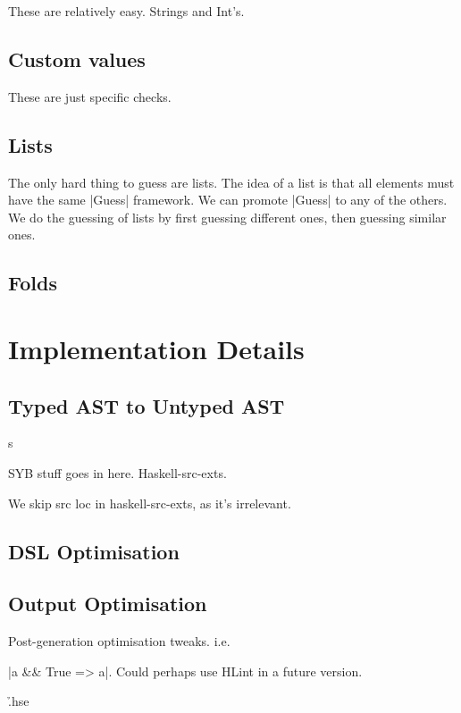 \documentclass[preprint]{sigplanconf}
\begin{document}
These are relatively easy. Strings and Int's.

\subsection{Custom values}

These are just specific checks.

\subsection{Lists}

The only hard thing to guess are lists. The idea of a list is that all elements must have the same |Guess| framework. We can promote |Guess| to any of the others. We do the guessing of lists by first guessing different ones, then guessing similar ones.

\subsection{Folds}


\section{Implementation Details}
\label{sec:implementation}

\subsection{Typed AST to Untyped AST}s
\label{sec:universe}

SYB stuff goes in here. Haskell-src-exts.

We skip src loc in haskell-src-exts, as it's irrelevant.

\subsection{DSL Optimisation}

\subsection{Output Optimisation}
\label{sec:simplify}

Post-generation optimisation tweaks. i.e. \ignore|a && True => a|. Could perhaps use HLint in a future version.

\h{.hse}
\end{document}
